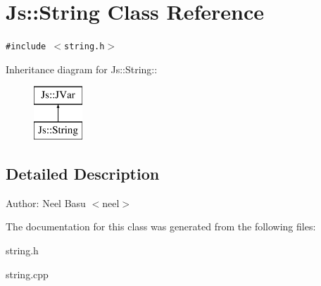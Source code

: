 \section{Js::String Class Reference}
\label{classJs_1_1String}
{\tt \#include $<$string.h$>$}

Inheritance diagram for Js::String::\begin{figure}[H]
\begin{center}
\leavevmode
\includegraphics[height=2cm]{classJs_1_1String}
\end{center}
\end{figure}


\subsection{Detailed Description}
\begin{Desc}
\item[Author:]Neel Basu $<$neel$>$ \end{Desc}


The documentation for this class was generated from the following files:\begin{CompactItemize}
\item 
string.h\item 
string.cpp\end{CompactItemize}
